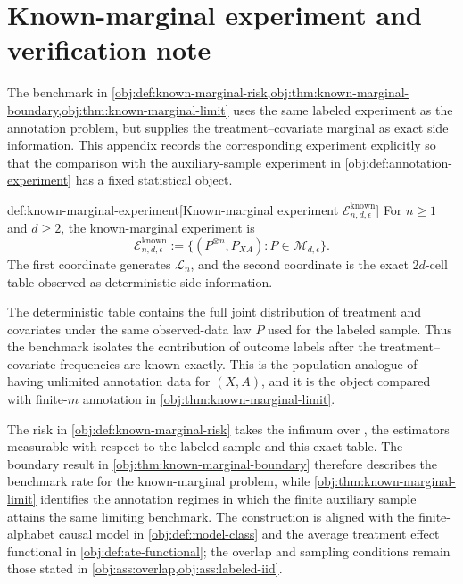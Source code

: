 \section{Known-marginal experiment and verification note}\label{sec:appendix-known}

The benchmark in \cref{obj:def:known-marginal-risk,obj:thm:known-marginal-boundary,obj:thm:known-marginal-limit} uses the same labeled experiment as the annotation problem, but supplies the treatment--covariate marginal as exact side information. This appendix records the corresponding experiment explicitly so that the comparison with the auxiliary-sample experiment in \cref{obj:def:annotation-experiment} has a fixed statistical object.

\begin{definitionv}{def:known-marginal-experiment}[Known-marginal experiment \(\mathcal E^{\mathrm{known}}_{n,d,\epsilon}\)]
For \(n\ge1\) and \(d\ge2\), the known-marginal experiment is
\[
\mathcal E^{\mathrm{known}}_{n,d,\epsilon}
:=
\{(P^{\otimes n},P_{XA}):P\in\mathcal M_{d,\epsilon}\}.
\]
The first coordinate generates \(\mathcal L_n\), and the second coordinate is the exact \(2d\)-cell table observed as deterministic side information.
\end{definitionv}

The deterministic table  contains the full joint distribution of treatment and covariates under the same observed-data law \(P\) used for the labeled sample. Thus the benchmark isolates the contribution of outcome labels after the treatment--covariate frequencies are known exactly. This is the population analogue of having unlimited annotation data for \((X,A)\), and it is the object compared with finite-\(m\) annotation in \cref{obj:thm:known-marginal-limit}.

The risk  in \cref{obj:def:known-marginal-risk} takes the infimum over , the estimators measurable with respect to the labeled sample and this exact table. The boundary result in \cref{obj:thm:known-marginal-boundary} therefore describes the benchmark rate for the known-marginal problem, while \cref{obj:thm:known-marginal-limit} identifies the annotation regimes in which the finite auxiliary sample attains the same limiting benchmark. The construction is aligned with the finite-alphabet causal model in \cref{obj:def:model-class} and the average treatment effect functional in \cref{obj:def:ate-functional}; the overlap and sampling conditions remain those stated in \cref{obj:ass:overlap,obj:ass:labeled-iid}.


